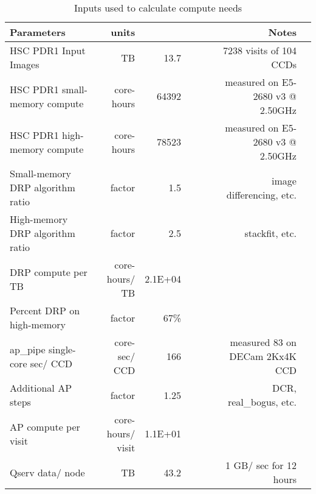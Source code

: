 \tiny \begin{longtable} { |p{}  |r  |r  |r  |r  |r  |r  |r |} 
\caption{Inputs used to calculate compute needs \label{tab:computeSizing}}\\ 
\hline 
\textbf{Parameters}&\textbf{units}&\textbf{}&\textbf{}&\textbf{}&\textbf{}&\textbf{Notes} \\ \hline
{HSC PDR1 Input Images}&{TB}&{13.7}&{}&{}&{}&{7238 visits of 104 CCDs} \\ \hline
{HSC PDR1 small-memory compute}&{core-hours}&{64392}&{}&{}&{}&{measured on E5-2680 v3 @ 2.50GHz} \\ \hline
{HSC PDR1 high-memory compute}&{core-hours}&{78523}&{}&{}&{}&{measured on E5-2680 v3 @ 2.50GHz} \\ \hline
{Small-memory DRP algorithm ratio}&{factor}&{1.5}&{}&{}&{}&{image differencing, etc.} \\ \hline
{High-memory DRP algorithm ratio}&{factor}&{2.5}&{}&{}&{}&{stackfit, etc.} \\ \hline
{DRP compute per TB}&{core-hours/ TB}&{2.1E+04}&&&& \\ \hline
{Percent DRP on high-memory}&{factor}&{67\%}&&&& \\ \hline
{ap\_pipe single-core sec/ CCD}&{core-sec/ CCD}&{166}&{}&{}&{}&{measured 83 on DECam 2Kx4K CCD} \\ \hline
{Additional AP steps}&{factor}&{1.25}&{}&{}&{}&{DCR, real\_bogus, etc.} \\ \hline
{AP compute per visit}&{core-hours/ visit}&{1.1E+01}&&&& \\ \hline
{Qserv data/ node}&{TB}&{43.2}&{}&{}&{}&{1 GB/ sec for 12 hours} \\ \hline
\end{longtable} \normalsize

